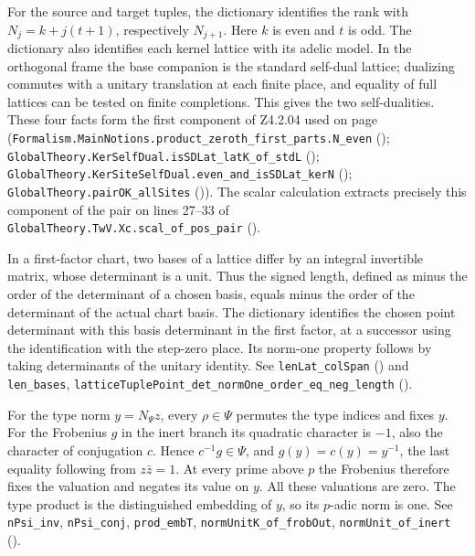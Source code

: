 For the source and target tuples, the dictionary identifies the rank with $N_j=k+j(t+1)$, respectively $N_{j+1}$. Here $k$ is even and $t$ is odd. The dictionary also identifies each kernel lattice with its adelic model. In the orthogonal frame the base companion is the standard self-dual lattice; dualizing commutes with a unitary translation at each finite place, and equality of full lattices can be tested on finite completions. This gives the two self-dualities. These four facts form the first component of Z4.2.04 used on page~\pageref{r6:Z4.2.08} (\nolinkurl{Formalism.MainNotions.product_zeroth_first_parts.N_even} (); \nolinkurl{GlobalTheory.KerSelfDual.isSDLat_latK_of_stdL} (); \nolinkurl{GlobalTheory.KerSiteSelfDual.even_and_isSDLat_kerN} (); \nolinkurl{GlobalTheory.pairOK_allSites} ()). The scalar calculation extracts precisely this component of the pair on lines 27--33 of \nolinkurl{GlobalTheory.TwV.Xc.scal_of_pos_pair} ().

In a first-factor chart, two bases of a lattice differ by an integral invertible matrix, whose determinant is a unit. Thus the signed length, defined as minus the order of the determinant of a chosen basis, equals minus the order of the determinant of the actual chart basis. The dictionary identifies the chosen point determinant with this basis determinant in the first factor, at a successor using the identification with the step-zero place. Its norm-one property follows by taking determinants of the unitary identity. See \nolinkurl{lenLat_colSpan} () and \nolinkurl{len_bases}, \nolinkurl{latticeTuplePoint_det_normOne_order_eq_neg_length} ().

For the type norm $y=N_\Psi z$, every $\rho\in\Psi$ permutes the type indices and fixes $y$. For the Frobenius $g$ in the inert branch its quadratic character is $-1$, also the character of conjugation $c$. Hence $c^{-1}g\in\Psi$, and $g(y)=c(y)=y^{-1}$, the last equality following from $z\bar z=1$. At every prime above $p$ the Frobenius therefore fixes the valuation and negates its value on $y$. All these valuations are zero. The type product is the distinguished embedding of $y$, so its $p$-adic norm is one. See \nolinkurl{nPsi_inv}, \nolinkurl{nPsi_conj}, \nolinkurl{prod_embT}, \nolinkurl{normUnitK_of_frobOut}, \nolinkurl{normUnit_of_inert} ().

